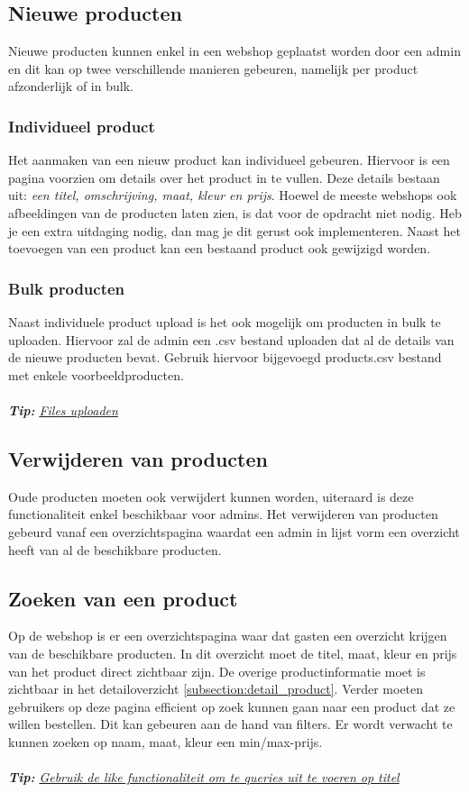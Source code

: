 \documentclass{article}
\begin{document}
\subsection{Nieuwe producten}
Nieuwe producten kunnen enkel in een webshop geplaatst worden door een admin en dit kan op twee verschillende manieren gebeuren, namelijk per product afzonderlijk of in bulk.

\subsubsection{Individueel product}
Het aanmaken van een nieuw product kan individueel gebeuren. Hiervoor is een pagina voorzien om details over het product in te vullen. Deze details bestaan uit: \textit{een titel, omschrijving, maat, kleur en prijs}. Hoewel de meeste webshops ook afbeeldingen van de producten laten zien, is dat voor de opdracht niet nodig. Heb je een extra uitdaging nodig, dan mag je dit gerust ook implementeren. Naast het toevoegen van een product kan een bestaand product ook gewijzigd worden.

\subsubsection{Bulk producten}
Naast individuele product upload is het ook mogelijk om producten in bulk te uploaden. Hiervoor zal de admin een .csv bestand uploaden dat al de details van de nieuwe producten bevat. Gebruik hiervoor bijgevoegd products.csv bestand met enkele voorbeeldproducten.
\\
\\
\textit{\textbf{Tip:} \href{https://phoenixframework.readme.io/v0.14.0/docs/file-uploads}{Files uploaden}}


\subsection{Verwijderen van producten}
Oude producten moeten ook verwijdert kunnen worden, uiteraard is deze functionaliteit enkel beschikbaar voor admins. Het verwijderen van producten gebeurd vanaf een overzichtspagina waardat een admin in lijst vorm een overzicht heeft van al de beschikbare producten.

\subsection{Zoeken van een product}
Op de webshop is er een overzichtspagina waar dat gasten een overzicht krijgen van de beschikbare producten. In dit overzicht moet de titel, maat, kleur en prijs van het product direct zichtbaar zijn. De overige productinformatie moet is zichtbaar in het detailoverzicht \ref{subsection:detail_product}. Verder moeten gebruikers op deze pagina efficient op zoek kunnen gaan naar een product dat ze willen bestellen. Dit kan gebeuren aan de hand van filters. Er wordt verwacht te kunnen zoeken op naam, maat, kleur een min/max-prijs. 
\\
\\
\textit{\textbf{Tip:} \href{https://hexdocs.pm/ecto/Ecto.Query.API.html}{Gebruik de like functionaliteit om te queries uit te voeren op titel}}
\end{document}
